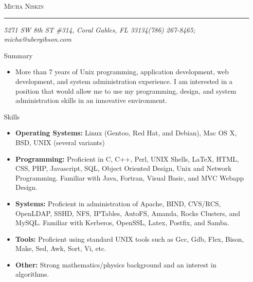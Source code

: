 \documentclass[9pt,oneside]{article}
\makeatletter
\newcommand{\name}{Micha Niskin}
\newcommand{\addr}{5271 SW 8th ST \#314, Coral Gables, FL 33134}
\newcommand{\phone}{(786) 267-8465}
\newcommand{\email}{micha@ubergibson.com}
\newcommand{\bigname}[1]{
	\begin{center}\fontfamily{phv}\selectfont\Huge\scshape#1\end{center}
}
\newenvironment{ressection}[1]{
	\vspace{4pt}
	{\fontfamily{phv}\selectfont\Large#1}
	\begin{itemize}
	\vspace{3pt}
}{
	\end{itemize}
}
\newcommand{\resitem}[1]{
	\vspace{-4pt}
	\item \begin{flushleft} #1 \end{flushleft}
}
\newcommand{\ressubitem}[1]{
	\vspace{-1pt}
	\item \begin{flushleft} #1 \end{flushleft}
}
\makeatother
\begin{document}
 \selectfont

\bigname{\name}

\vspace{-8pt} \rule{\textwidth}{1pt}

\vspace{-1pt} {\small\itshape \addr \hfill \phone; \email}

\vspace{8 pt}




\begin{ressection}{Summary}

\item {More than 7 years of Unix programming, application development, web development, and system administration experience. I am interested in a position that would allow me to use my programming, design, and system administration skills in an innovative environment.}

\end{ressection}


\begin{ressection}{Skills}

	\resitem{\textbf{Operating Systems:} Linux (Gentoo, Red Hat, and Debian), Mac OS X, BSD, UNIX (several variants)}

	\ressubitem{\textbf{Programming:} Proficient in C, C++, Perl, UNIX Shells, \LaTeX, HTML, CSS, PHP, Javascript, SQL, Object Oriented Design, Unix and Network Programming. Familiar with Java, Fortran, Visual Basic, and MVC Webapp Design.}

	\ressubitem{\textbf{Systems:} Proficient in administration of Apache, BIND, CVS/RCS, OpenLDAP, SSHD, NFS, IPTables, AutoFS, Amanda, Rocks Clusters, and MySQL. Familiar with Kerberos, OpenSSL, Latex, Postfix, and Samba.}

	\resitem{\textbf{Tools:} Proficient using standard UNIX tools such as Gcc, Gdb, Flex, Bison, Make, Sed, Awk, Sort, Vi, etc.}


	\ressubitem{\textbf{Other:} Strong mathematics/physics background and an interest in algorithms.}


\end{ressection}
\end{document}
